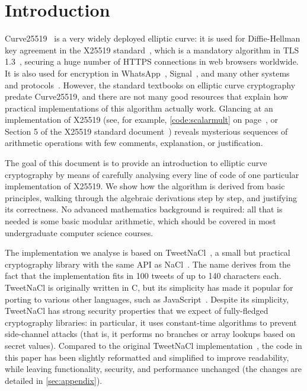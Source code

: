 \documentclass[manuscript]{acmart}
\begin{document}
\maketitle

\section{Introduction}

Curve25519~\cite{Bernstein:2006kw} is a very widely deployed elliptic curve: it is used for Diffie-Hellman key agreement in the X25519 standard~\cite{X25519}, which is a mandatory algorithm in TLS 1.3~\cite{TLS13}, securing a huge number of HTTPS connections in web browsers worldwide.
It is also used for encryption in WhatsApp~\cite{WhatsAppWhitepaper}, Signal~\cite{Marlinspike:2016}, and many other systems and protocols~\cite{UseCurve25519}.
However, the standard textbooks on elliptic curve cryptography \cite{Blake:1999,Cohen:2006,Hankerson:2004,Koblitz:1994} predate Curve25519, and there are not many good resources that explain how practical implementations of this algorithm actually work.
Glancing at an implementation of X25519 (see, for example, \autoref{code:scalarmult} on page~\pageref{code:scalarmult}, or Section 5 of the X25519 standard document~\cite{X25519}) reveals mysterious sequences of arithmetic operations with few comments, explanation, or justification.

The goal of this document is to provide an introduction to elliptic curve cryptography by means of carefully analysing every line of code of one particular implementation of X25519.
We show how the algorithm is derived from basic principles, walking through the algebraic derivations step by step, and justifying its correctness.
No advanced mathematics background is required: all that is needed is some basic modular arithmetic, which should be covered in most undergraduate computer science courses.

The implementation we analyse is based on TweetNaCl~\cite{Bernstein:2014ca,TweetNaCl}, a small but practical cryptography library with the same API as NaCl~\cite{NaCl,Bernstein:2012}.
The name derives from the fact that the implementation fits in 100 tweets of up to 140 characters each.
TweetNaCl is originally written in C, but its simplicity has made it popular for porting to various other languages, such as JavaScript~\cite{TweetNaCljs}.
Despite its simplicity, TweetNaCl has strong security properties that we expect of fully-fledged cryptography libraries: in particular, it uses constant-time algorithms to prevent side-channel attacks (that is, it performs no branches or array lookups based on secret values).
Compared to the original TweetNaCl implementation~\cite{TweetNaCl}, the code in this paper has been slightly reformatted and simplified to improve readability, while leaving functionality, security, and performance unchanged (the changes are detailed in \autoref{sec:appendix}).
\end{document}
